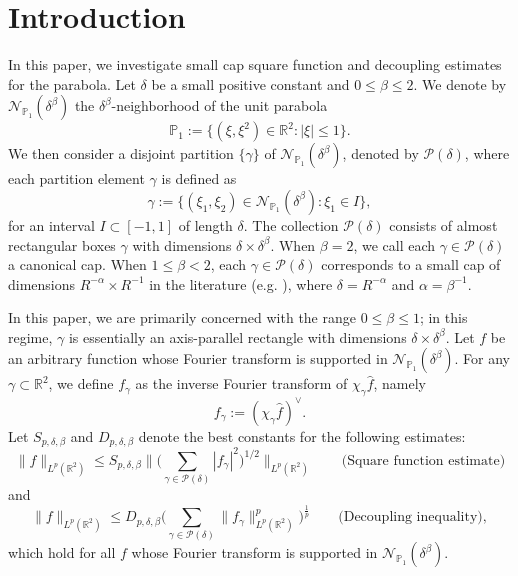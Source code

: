\documentclass[reqno,centertags,11pt,a4paper]{amsart}
\begin{document}
\section{ Introduction }
In this paper, we investigate small cap square function and decoupling estimates for the parabola.
Let $\delta$ be a small positive constant and $0\leq\beta\leq 2$. We denote by $\mathcal{N}_{\mathbb{P}_1}(\delta^\beta)$ the $\delta^\beta$-neighborhood of the unit parabola
\[
\mathbb{P}_1 := \bigl\{ (\xi, \xi^2) \in \mathbb{R}^2 : |\xi| \le 1 \bigr\}.
\]
We then consider a disjoint partition $\{ \gamma\}$ of $\mathcal{N}_{\mathbb{P}_1}(\delta^\beta)$, denoted by $\mathcal{P}(\delta)$, where each partition element $\gamma$ is defined as
\[
\gamma := \bigl\{ (\xi_1, \xi_2) \in \mathcal{N}_{\mathbb{P}_1}(\delta^\beta) : \xi_1 \in I  \bigr\},
\]
for an interval $I\subset[-1,1]$ of length $\delta$.
The collection $\mathcal{P}(\delta)$ consists of almost rectangular boxes $\gamma$ with dimensions $\delta \times \delta^\beta$. When $\beta=2$, we call each $\gamma\in \mathcal{P}(\delta)$ a canonical cap. When $1\leq \beta<2$, each $\gamma\in \mathcal{P}(\delta)$ corresponds to a small cap of dimensions $R^{-\alpha}\times R^{-1}$ in the literature (e.g. \cite{DGW20}), where $\delta=R^{-\alpha}$ and $\alpha = \beta^{-1}$.

In this paper, we are primarily concerned with the range $0\leq \beta \leq 1$; in this regime, $\gamma$ is essentially an axis-parallel rectangle with dimensions $\delta\times \delta^\beta$. Let $f$ be an arbitrary function whose Fourier transform is supported in $\mathcal{N}_{\mathbb{P}_1}(\delta^\beta)$.  For any $\gamma\subset \mathbb{R}^2$, we define $f_\gamma$ as the inverse Fourier transform of $\chi_{\gamma}\widehat{f}$, namely
$$
f_\gamma:=(\chi_{\gamma}\widehat{f})^{\vee}.
$$
Let $S_{p,\delta,\beta}$ and $D_{p,\delta,\beta}$ denote the best constants for the following estimates:
\begin{equation*}
    \|f\|_{L^p(\mathbb{R}^2)} \leq S_{p,\delta,\beta} \bigg\|\bigg(\sum_{\gamma\in\mathcal{P}(\delta) }|f_\gamma|^2\bigg)^{1/2}\bigg\|_{L^p(\mathbb{R}^2)}\qquad \text{(Square function estimate)}
\end{equation*}
and
\begin{equation*}
  \|f\|_{L^p(\mathbb{R}^2)}\leq D_{p,\delta,\beta}\bigg(\sum_{\gamma\in\mathcal{P}(\delta)}\|f_\gamma\|_{L^p(\mathbb{R}^2)}^p\bigg)^{\frac{1}{p}}\qquad \text{(Decoupling inequality)},
\end{equation*}
which hold for all $f$ whose Fourier transform is supported in $\mathcal{N}_{\mathbb{P}_1}(\delta^\beta)$.
\end{document}
